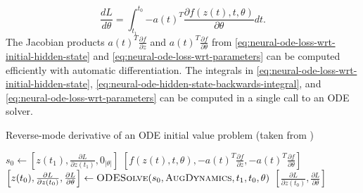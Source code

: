 \begin{equation}
    \frac{dL}{d\theta} = \int_{t_1}^{t_0}{-a(t)^T\frac{\partial f(z(t), t, \theta)}{\partial \theta}} dt.
    \label{eq:neural-ode-loss-wrt-parameters}
\end{equation}
The Jacobian products $a(t)^T\frac{\partial f}{\partial z}$ and $a(t)^T\frac{\partial f}{\partial \theta}$ from \autoref{eq:neural-ode-loss-wrt-initial-hidden-state} and \autoref{eq:neural-ode-loss-wrt-parameters} can be computed efficiently with automatic differentiation.
The integrals in \autoref{eq:neural-ode-loss-wrt-initial-hidden-state}, \autoref{eq:neural-ode-hidden-state-backwards-integral}, and \autoref{eq:neural-ode-loss-wrt-parameters} can be computed in a single call to an \gls{ODE} solver.

\begin{algorithm}
    \caption{Reverse-mode derivative of an ODE initial value problem (taken from \cite{chenNeuralOrdinaryDifferential2019})}
    \label{alg:neural-ode-reverse-mode-diff}
    \begin{algorithmic}
            \State $s_0 \gets \left[z(t_1), \frac{\partial L}{\partial z(t_1)}, 0_{|\theta|}\right]$
                \State \Return $\left[f(z(t), t, \theta), -a(t)^T\frac{\partial f}{\partial z}, -a(t)^T\frac{\partial f}{\partial \theta}\right]$
            \EndFunction
            \State $\left[z(t_0), \frac{\partial L}{\partial z(t_0)}, \frac{\partial L}{\partial \theta}\right] \gets \Call{ODESolve}{s_0, \textproc{AugDynamics}, t_1, t_0, \theta}$
            \State \Return $\left[\frac{\partial L}{\partial z(t_0)}, \frac{\partial L}{\partial \theta}\right]$
        \EndFunction
    \end{algorithmic}
\end{algorithm}